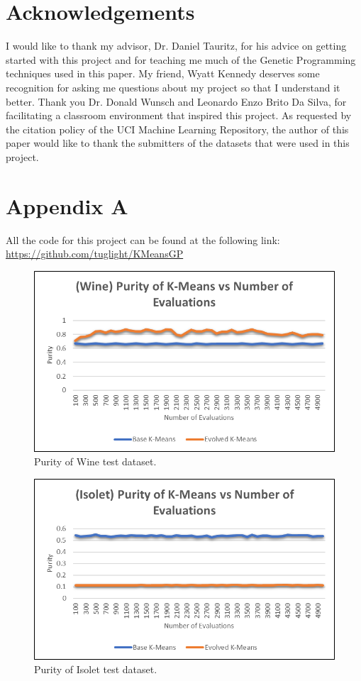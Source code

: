 \documentclass[conference]{IEEEtran}
\begin{document}
\onecolumn
\section{Acknowledgements}
I would like to thank my advisor, Dr. Daniel Tauritz, for his advice on getting started with this project and for teaching me much of the Genetic Programming techniques used in this paper.  My friend, Wyatt Kennedy deserves some recognition for asking me questions about my project so that I understand it better.  Thank you Dr. Donald Wunsch and Leonardo Enzo Brito Da Silva, for facilitating a classroom environment that inspired this project.  As requested by the citation policy of the UCI Machine Learning Repository, the author of this paper would like to thank the submitters of the datasets that were used in this project. 
\clearpage


 

\onecolumn
\section{Appendix A}
All the code for this project can be found at the following link: \href{https://github.com/tuglight/KMeansGP}{https://github.com/tuglight/KMeansGP}\cite{KMeansGP}

\begin{figure}[H]
\begin{center}
\includegraphics[width=0.7\columnwidth]{winepurity.png}
\caption{Purity of Wine test dataset.}
\end{center}
\label{fig}
\end{figure}

\begin{figure}[H]
\begin{center}
\includegraphics[width=0.7\columnwidth]{isoletpurity.png}
\caption{Purity of Isolet test dataset.}
\end{center}
\label{fig}
\end{figure}
\end{document}
